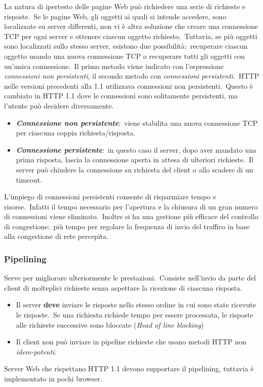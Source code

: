 La natura di ipertesto delle pagine Web può richiedere una serie di richieste e risposte.\
Se le pagine Web, gli oggetti ai quali si intende accedere, sono localizzate su server differenti, non vi è altra soluzione che creare una connessione TCP per ogni server e ottenere ciascun oggetto richiesto.\
Tuttavia, se più oggetti sono localizzati sullo stesso server, esistono due possibilità:\ recuperare ciascun oggetto usando una nuova connessione TCP o recuperare tutti gli oggetti con un'unica connessione.\
Il primo metodo viene indicato con l'espressione \emph{connessioni non persistenti}, il secondo metodo con \emph{connessioni persistenti}.\
HTTP nelle versioni precedenti alla 1.1 utilizzava connessioni non persistenti.\
Questo è cambiato in HTTP 1.1 dove le connessioni sono solitamente persistenti, ma l'utente può decidere diversamente.
\begin{itemize}
    \item \textbf{\emph{Connessione non persistente}}:\ viene stabilita una nuova connessione TCP per ciascuna coppia richiesta/risposta.
    \item \textbf{\emph{Connessione persistente}}:\ in questo caso il server, dopo aver mandato una prima risposta, lascia la connessione aperta in attesa di ulteriori richieste.\
          Il server può chiudere la connessione su richiesta del client o allo scadere di un timeout.
\end{itemize}
L'impiego di connessioni persistenti consente di risparmiare tempo e risorse.\
Infatti il tempo necessario per l'apertura e la chiusura di un gran numero di connessioni viene eliminato.\
Inoltre si ha una gestione più efficace del controllo di congestione:\ più tempo per regolare la frequenza di invio del traffico in base alla congestione di rete percepita.

\subsubsection{Pipelining}

Serve per migliorare ulteriormente le prestazioni.\
Consiste nell'invio da parte del client di molteplici richieste senza aspettare la ricezione di ciascuna risposta.
\begin{itemize}
    \item Il server \textbf{deve} inviare le risposte nello stesso ordine in cui sono state ricevute le risposte.\
          Se una richiesta richiede tempo per essere processata, le risposte alle richieste successive sono bloccate (\emph{Head of line blocking})
    \item Il client non può inviare in pipeline richieste che usano metodi HTTP non \emph{idem-potenti}.
\end{itemize}
Server Web che rispettano HTTP 1.1 devono supportare il pipelining, tuttavia è implementato in pochi browser.

